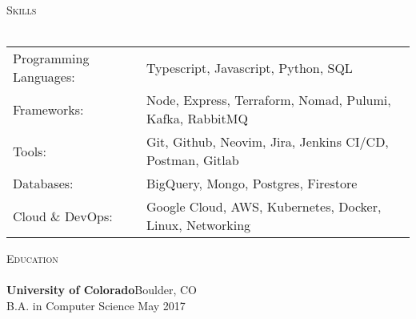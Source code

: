 \documentclass[a4paper]{article}
\newcommand{\lineunder} {
    \vspace*{-8pt} \\
    \hspace*{-18pt} \hrulefill \\
}
\newcommand{\header} [1] {
    {\hspace*{-18pt}\vspace*{6pt} \textsc{#1}}
    \vspace*{-6pt} \lineunder
}
\begin{document}
\header{Skills}
\begin{tabular}{ l l }
	Programming Languages: & Typescript, Javascript, Python, SQL                         \\
	Frameworks:            & Node, Express, Terraform, Nomad, Pulumi, Kafka, RabbitMQ    \\
	Tools:                 & Git, Github, Neovim, Jira, Jenkins CI/CD, Postman, Gitlab   \\
	Databases:             & BigQuery, Mongo, Postgres, Firestore                        \\
  Cloud \& DevOps:       & Google Cloud, AWS, Kubernetes, Docker, Linux, Networking    \\
\end{tabular}
\vspace{2mm}


%
%
%

\header{Education}
\textbf{University of Colorado}\hfill Boulder, CO\\
B.A. in Computer Science  \hfill May 2017\\
\vspace{2mm}


\end{document}
